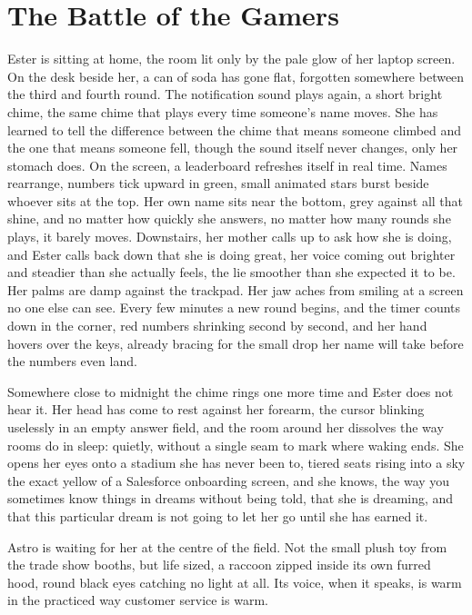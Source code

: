 \documentclass{article}
\begin{document}
\section{The Battle of the Gamers}
Ester is sitting at home, the room lit only by the pale glow of her laptop screen. 
On the desk beside her, a can of soda has gone flat, forgotten somewhere between the third and fourth round. 
The notification sound plays again, a short bright chime, the same chime that plays every time someone's name moves. 
She has learned to tell the difference between the chime that means someone climbed and the one that means someone fell, though the sound itself never changes, only her stomach does. 
On the screen, a leaderboard refreshes itself in real time. Names rearrange, numbers tick upward in green, small animated stars burst beside whoever sits at the top. 
Her own name sits near the bottom, grey against all that shine, and no matter how quickly she answers, no matter how many rounds she plays, it barely moves.
Downstairs, her mother calls up to ask how she is doing, and Ester calls back down that she is doing great, her voice coming out brighter and steadier than she actually feels, the lie smoother than she expected it to be. Her palms are damp against the trackpad.
Her jaw aches from smiling at a screen no one else can see. Every few minutes a new round begins, and the timer counts down in the corner, red numbers shrinking second by second, and her hand hovers over the keys, already bracing for the small drop her name will take before the numbers even land.

Somewhere close to midnight the chime rings one more time and Ester does not hear it. Her head has come to rest against her forearm, the cursor blinking uselessly in an empty answer field, and the room around her dissolves the way rooms do in sleep: quietly, without a single seam to mark where waking ends. She opens her eyes onto a stadium she has never been to, tiered seats rising into a sky the exact yellow of a Salesforce onboarding screen, and she knows, the way you sometimes know things in dreams without being told, that she is dreaming, and that this particular dream is not going to let her go until she has earned it.

Astro is waiting for her at the centre of the field. Not the small plush toy from the trade show booths, but life sized, a raccoon zipped inside its own furred hood, round black eyes catching no light at all. Its voice, when it speaks, is warm in the practiced way customer service is warm.
\end{document}
